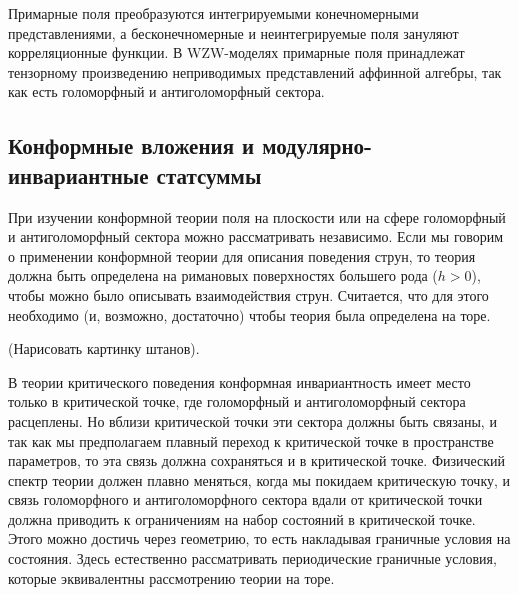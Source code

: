 Примарные поля преобразуются  интегрируемыми конечномерными представлениями, а бесконечномерные и
неинтегрируемые поля зануляют корреляционные функции.
В WZW-моделях примарные поля
принадлежат тензорному произведению неприводимых представлений аффинной алгебры, так как есть
голоморфный и антиголоморфный сектора.


\subsection{Конформные вложения и модулярно-инвариантные статсуммы}
\label{sec:modular-invariance}

При изучении конформной теории поля на плоскости или на сфере 
голоморфный и антиголоморфный сектора можно рассматривать независимо. 
Если мы говорим о применении конформной теории для описания поведения струн, то теория должна быть
определена на римановых поверхностях большего рода ($h>0$), чтобы можно было описывать
взаимодействия струн. Считается, что для этого необходимо (и, возможно, достаточно) чтобы теория была определена на торе.

(Нарисовать картинку штанов).

В теории критического поведения конформная инвариантность имеет место только в критической точке,
где голоморфный и антиголоморфный сектора расцеплены. Но вблизи критической точки эти сектора должны
быть связаны, и так как мы предполагаем плавный переход к критической точке в пространстве
параметров, то эта связь должна сохраняться и в критической точке. Физический спектр теории должен
плавно меняться, когда мы покидаем критическую точку, и связь голоморфного и антиголоморфного
сектора вдали от критической точки должна приводить к ограничениям на набор состояний в критической
точке. Этого можно достичь через геометрию, то есть накладывая граничные условия на состояния. Здесь
естественно рассматривать периодические граничные условия, которые эквивалентны рассмотрению теории
на торе.

